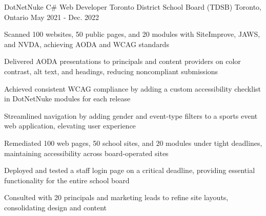 \begin{cventries}
\cventry
  {DotNetNuke C\# Web Developer}
  {Toronto District School Board (TDSB)}
  {Toronto, Ontario}
  {May 2021 - Dec. 2022}
  {
    \begin{cvitems}
      \item {Scanned 100 websites, 50 public pages, and 20 modules with SiteImprove, JAWS, and NVDA, achieving AODA and WCAG standards}
      \item {Delivered AODA presentations to principals and content providers on color contrast, alt text, and headings, reducing noncompliant submissions}
      \item {Achieved consistent WCAG compliance by adding a custom accessibility checklist in DotNetNuke modules for each release}
      \item {Streamlined navigation by adding gender and event-type filters to a sports event web application, elevating user experience}
      \item {Remediated 100 web pages, 50 school sites, and 20 modules under tight deadlines, maintaining accessibility across board-operated sites}
      \item {Deployed and tested a staff login page on a critical deadline, providing essential functionality for the entire school board}
      \item {Consulted with 20 principals and marketing leads to refine site layouts, consolidating design and content}
    \end{cvitems}
  }


\end{cventries}
